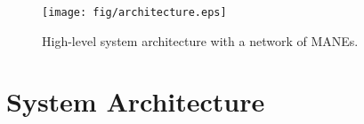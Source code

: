 \begin{figure}[tbh]
		\centering
		\texttt{[image: fig/architecture.eps]}
		\caption{High-level system architecture with a network of MANEs.}
\vspace{-0.1cm}
		\label{architecture} 
\end{figure}

\section{System Architecture} \label{sec:architecture}

%
